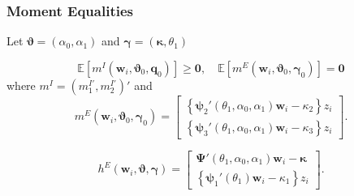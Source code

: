 \documentclass{beamer}
\begin{document}
\begin{frame}
  \frametitle{Moment Equalities}
Let $\boldsymbol{\vartheta} = (\alpha_0, \alpha_1)$ and $\boldsymbol{\gamma} = (\boldsymbol{\kappa}, \theta_1)$ 

\begin{equation}
  \mathbb{E}[m^I(\mathbf{w}_i, \boldsymbol{\vartheta}_0, \mathbf{q}_0)] \geq \mathbf{0}, \quad 
  \mathbb{E}[m^E(\mathbf{w}_i, \boldsymbol{\vartheta}_0, \boldsymbol{\gamma}_0)] = \mathbf{0}
  \label{eq:MCs_ineq_eq}
\end{equation}
where $m^I = (m_1^{I'}, m_2^{I'})'$ and 
\begin{equation}
  m^E(\mathbf{w}_i, \boldsymbol{\vartheta}_0, \boldsymbol{\gamma}_0)= \left[
  \begin{array}{c}
 \left\{ \boldsymbol{\psi}_2'(\theta_1, \alpha_0, \alpha_1) \mathbf{w}_i - \kappa_2 \right\}z_i \\
 \left\{ \boldsymbol{\psi}_3'(\theta_1, \alpha_0, \alpha_1) \mathbf{w}_i - \kappa_3 \right\}z_i 
  \end{array}
\right].
\label{eq:mE}
\end{equation}

\begin{equation}
  h^E(\mathbf{w}_i, \boldsymbol{\vartheta}, \boldsymbol{\gamma})  =  \left[
 \begin{array}{l}
   \boldsymbol{\Psi}'(\theta_1, \alpha_0, \alpha_1) \mathbf{w}_i - \boldsymbol{\kappa}\\
   \left\{\boldsymbol{\psi}_1'(\theta_1)\mathbf{w}_i - \kappa_1\right\}z_i
 \end{array}
 \right].
 \label{eq:hE}
\end{equation}

\end{frame}
\end{document}
